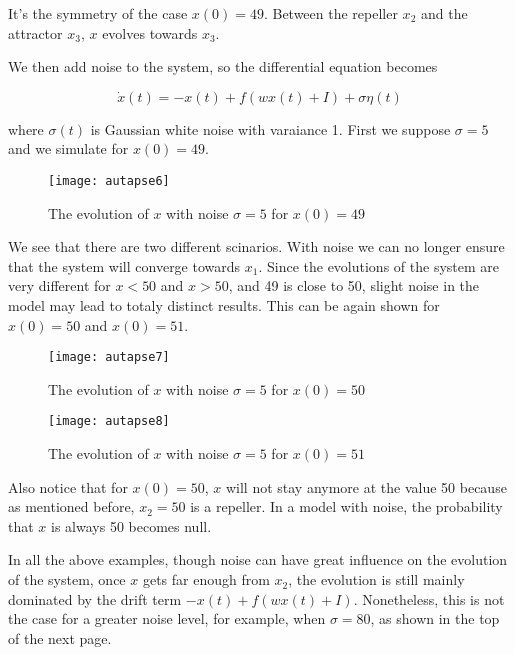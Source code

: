 \noindent
It's the symmetry of the case $x(0) = 49$. Between the repeller $x_2$ and
the attractor $x_3$, $x$ evolves towards $x_3$.

We then add noise to the system, so the differential equation becomes

\[\dot{x}(t) = -x(t) + f(wx(t)+I) + \sigma\eta(t)\]

\noindent
where $\sigma(t)$ is Gaussian white noise with varaiance 1. First we suppose 
$\sigma = 5$ and we simulate for $x(0) = 49$.

\vspace{-1em}
\begin{figure}[H]
  \centering
  \texttt{[image: autapse6]}
  \caption{The evolution of $x$ with noise $\sigma = 5$ for $x(0) = 49$}
\end{figure}

We see that there are two different scinarios. With noise we can no longer
ensure that the system will converge towards $x_1$. Since the evolutions of
the system are very different for $x < 50$ and $x > 50$, and 49 is close
to 50, slight noise in the model may lead to totaly distinct results. This can
be again shown for $x(0) = 50$ and $x(0) = 51$.

\vspace{-1em}
\begin{figure}[H]
  \centering
  \texttt{[image: autapse7]}
  \caption{The evolution of $x$ with noise $\sigma = 5$ for $x(0) = 50$}
\end{figure}

\vspace{-1em}
\begin{figure}[H]
  \centering
  \texttt{[image: autapse8]}
  \caption{The evolution of $x$ with noise $\sigma = 5$ for $x(0) = 51$}
\end{figure}

Also notice that for $x(0) = 50$, $x$ will not stay anymore at the value 50 
because as mentioned before, $x_2 = 50$ is a repeller. In a model with noise,
the probability that $x$ is always 50 becomes null. 

In all the above examples, though noise can have great influence on the 
evolution of the system, once $x$ gets far enough from $x_2$, the evolution
is still mainly dominated by the drift term $-x(t) + f(wx(t)+I)$.
Nonetheless, this is not the case for a greater noise level, for example,
when $\sigma = 80$, as shown in the top of the next page.


